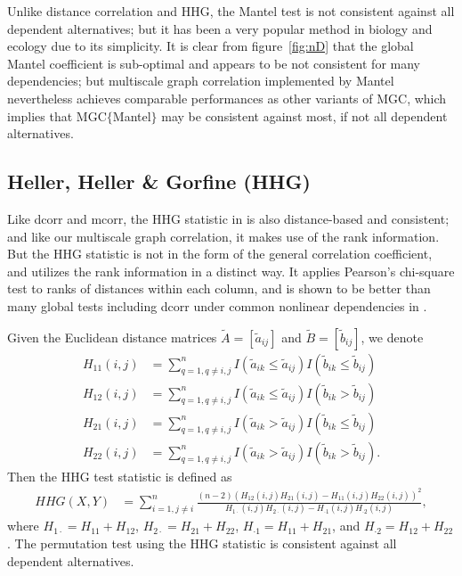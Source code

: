 \documentclass[11pt]{article}
\begin{document}
Unlike distance correlation and HHG, the Mantel test is not consistent against all dependent alternatives; but it has been a very popular method in biology and ecology due to its simplicity. It is clear from figure~\ref{fig:nD} that the global Mantel coefficient is sub-optimal and appears to be not consistent for many dependencies; but multiscale graph correlation implemented by Mantel nevertheless achieves comparable performances as other variants of MGC, which implies that MGC$\{$Mantel$\}$ may be consistent against most, if not all dependent alternatives.

\subsection{Heller, Heller \& Gorfine (HHG)}
\label{appen:hhg}
Like dcorr and mcorr, the HHG statistic in \cite{HellerGorfine2013} is also distance-based and consistent; and like our multiscale graph correlation, it makes use of the rank information. But the HHG statistic is not in the form of the general correlation coefficient, and utilizes the rank information in a distinct way. It applies Pearson's chi-square test to ranks of distances within each column, and is shown to be better than many global tests including dcorr under common nonlinear dependencies in \cite{GorfineHellerHeller2012, HellerGorfine2013}. 

Given the Euclidean distance matrices $\tilde{A}=[\tilde{a}_{ij}]$ and $\tilde{B}=[\tilde{b}_{ij}]$, we denote
\begin{align*}
H_{11}(i,j) &= \sum_{q=1,q\neq i,j}^{n}I(\tilde{a}_{ik} \leq \tilde{a}_{ij})I(\tilde{b}_{ik} \leq \tilde{b}_{ij}) \\
H_{12}(i,j) &= \sum_{q=1,q\neq i,j}^{n}I(\tilde{a}_{ik} \leq \tilde{a}_{ij})I(\tilde{b}_{ik} > \tilde{b}_{ij}) \\
H_{21}(i,j) &= \sum_{q=1,q\neq i,j}^{n}I(\tilde{a}_{ik} > \tilde{a}_{ij})I(\tilde{b}_{ik} \leq \tilde{b}_{ij}) \\
H_{22}(i,j) &= \sum_{q=1,q\neq i,j}^{n}I(\tilde{a}_{ik} > \tilde{a}_{ij})I(\tilde{b}_{ik} > \tilde{b}_{ij}).
\end{align*}
Then the HHG test statistic is defined as
\begin{align*}
HHG(X,Y) &= \sum_{i=1,j\neq i}^{n} \frac{(n-2)(H_{12}(i,j)H_{21}(i,j)-H_{11}(i,j)H_{22}(i,j))^2}{H_{1 \cdot}(i,j)H_{2 \cdot}(i,j)-H_{\cdot 1}(i,j)H_{\cdot 2}(i,j)},
\end{align*}
where $H_{1 \cdot}=H_{11}+H_{12}$, $H_{2 \cdot}=H_{21}+H_{22}$, $H_{\cdot 1}=H_{11}+H_{21}$, and $H_{\cdot 2}=H_{12}+H_{22}$. The permutation test using the HHG statistic is consistent against all dependent alternatives.
\end{document}
